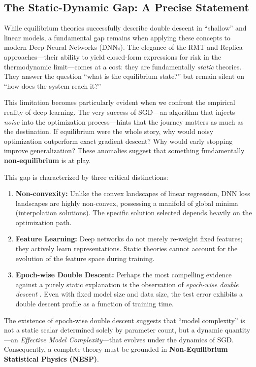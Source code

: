 \documentclass[
  journal=largetwo,
  year=2025,
  volume=37,
]{cup-journal}
\begin{document}
\subsection{The Static-Dynamic Gap: A Precise Statement}

While equilibrium theories successfully describe double descent in ``shallow'' and linear models, a fundamental gap remains when applying these concepts to modern Deep Neural Networks (DNNs). The elegance of the RMT and Replica approaches---their ability to yield closed-form expressions for risk in the thermodynamic limit---comes at a cost: they are fundamentally \textit{static} theories. They answer the question ``what is the equilibrium state?'' but remain silent on ``how does the system reach it?''

This limitation becomes particularly evident when we confront the empirical reality of deep learning. The very success of SGD---an algorithm that injects \textit{noise} into the optimization process---hints that the journey matters as much as the destination. If equilibrium were the whole story, why would noisy optimization outperform exact gradient descent? Why would early stopping improve generalization? These anomalies suggest that something fundamentally \textbf{non-equilibrium} is at play.

This gap is characterized by three critical distinctions:

\begin{enumerate}
    \item \textbf{Non-convexity:} Unlike the convex landscapes of linear regression, DNN loss landscapes are highly non-convex, possessing a manifold of global minima (interpolation solutions). The specific solution selected depends heavily on the optimization path.
    \item \textbf{Feature Learning:} Deep networks do not merely re-weight fixed features; they actively learn representations. Static theories cannot account for the evolution of the feature space during training.
    \item \textbf{Epoch-wise Double Descent:} Perhaps the most compelling evidence against a purely static explanation is the observation of \textit{epoch-wise double descent} \cite{nakkiran2021optimalregularizationmitigatedouble, heckel2020early}. Even with fixed model size and data size, the test error exhibits a double descent profile as a function of training time.
\end{enumerate}

The existence of epoch-wise double descent suggests that ``model complexity'' is not a static scalar determined solely by parameter count, but a dynamic quantity---an \textit{Effective Model Complexity}---that evolves under the dynamics of SGD. Consequently, a complete theory must be grounded in \textbf{Non-Equilibrium Statistical Physics (NESP)}.
\end{document}
